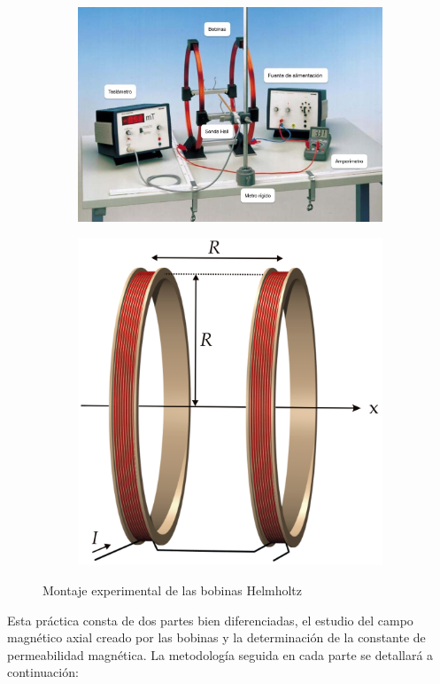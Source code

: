 \documentclass[a4paper,12pt,titlepage]{report}
\begin{document}
\begin{figure}[h!]
    \begin{subfigure}{0.6\textwidth}
        \centering
        \includegraphics[width=0.95\linewidth]{Images/Bobinas configuración-1.jpg}
    \end{subfigure}
    \begin{subfigure}{0.52\textwidth}
        \centering
        \includegraphics[width=0.75\linewidth]{Images/bobinas esquema.png}
    \end{subfigure}
    \caption{Montaje experimental de las bobinas Helmholtz}
\end{figure}

\par Esta práctica consta de dos partes bien diferenciadas, el estudio del campo magnético axial creado por las bobinas y la determinación de la constante de permeabilidad magnética. La metodología seguida en cada parte se detallará a continuación:
\end{document}
